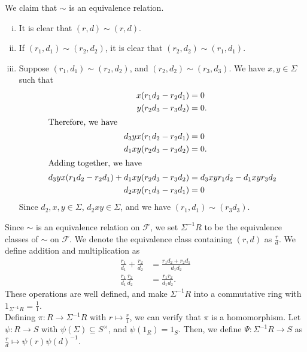 \documentclass[8pt]{extarticle}
\begin{document}
  We claim that $\sim$ is an equivalence relation.
  \begin{enumerate}[(i)]
    \item It is clear that $(r,d)\sim (r,d)$.
    \item If $(r_1,d_1)\sim (r_2,d_2)$, it is clear that $(r_2,d_2)\sim (r_1,d_1)$.
    \item Suppose $(r_1,d_1) \sim (r_2,d_2)$, and $(r_2,d_2)\sim (r_3,d_3)$. We have $x,y\in \Sigma$ such that 
      \begin{align*}
        x(r_1d_2-r_2d_1) &= 0\\
        y(r_2d_3 - r_3d_2) &= 0.\\
        \intertext{Therefore, we have}
        d_3yx(r_1d_2 - r_2d_1) &= 0\\
        d_1xy(r_2d_3 - r_3d_2) &= 0.\\
        \intertext{Adding together, we have}
        d_3yx(r_1d_2 - r_2d_1) + d_1xy(r_2d_3-r_3d_2) &= d_3xyr_1d_2-d_1xyr_3d_2\\
        d_2xy(r_1d_3-r_3d_1) &= 0
      \end{align*}
      Since $d_2,x,y\in \Sigma$, $d_2xy\in\Sigma$, and we have $(r_1,d_1)\sim (r_3d_3)$.
  \end{enumerate}
  Since $\sim$ is an equivalence relation on $\mathcal{F}$, we set $\Sigma^{-1}R$ to be the equivalence classes of $\sim$ on $\mathcal{F}$. We denote the equivalence class containing $(r,d)$ as $\frac{r}{d}$. We define addition and multiplication as
  \begin{align*}
    \frac{r_1}{d_1} + \frac{r_2}{d_2} &= \frac{r_1d_2 + r_2d_1}{d_1d_2}\\
    \frac{r_1}{d_1}\frac{r_2}{d_2} &= \frac{r_1r_2}{d_1d_2}.
  \end{align*}
  These operations are well defined, and make $\Sigma^{-1}R$ into a commutative ring with $1_{\Sigma^{-1}R} = \frac{1}{1}$.\\

  Defining $\pi: R\rightarrow \Sigma^{-1}R$ with $r\mapsto \frac{r}{1}$, we can verify that $\pi$ is a homomorphism. Let $\psi: R\rightarrow S$ with $\psi(\Sigma)\subseteq S^{\times}$, and $\psi(1_R) = 1_S$. Then, we define $\Psi: \Sigma^{-1}R\rightarrow S$ as $\frac{r}{d}\mapsto \psi(r)\psi(d)^{-1}$.\\
  
\end{document}
